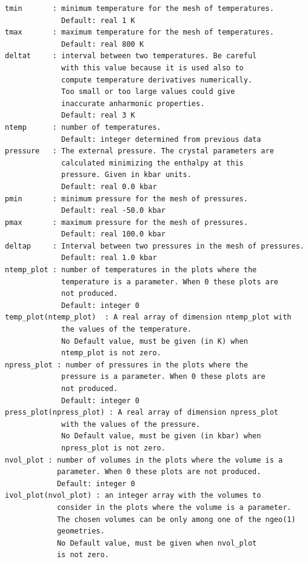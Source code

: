\documentclass[12pt,a4paper,twoside]{report}
\begin{document}
\begin{verbatim}
tmin       : minimum temperature for the mesh of temperatures.
             Default: real 1 K
tmax       : maximum temperature for the mesh of temperatures.
             Default: real 800 K
deltat     : interval between two temperatures. Be careful 
             with this value because it is used also to 
             compute temperature derivatives numerically. 
             Too small or too large values could give 
             inaccurate anharmonic properties.
             Default: real 3 K
ntemp      : number of temperatures.
             Default: integer determined from previous data
pressure   : The external pressure. The crystal parameters are
             calculated minimizing the enthalpy at this 
             pressure. Given in kbar units. 
             Default: real 0.0 kbar
pmin       : minimum pressure for the mesh of pressures.
             Default: real -50.0 kbar
pmax       : maximum pressure for the mesh of pressures.
             Default: real 100.0 kbar
deltap     : Interval between two pressures in the mesh of pressures.
             Default: real 1.0 kbar
ntemp_plot : number of temperatures in the plots where the 
             temperature is a parameter. When 0 these plots are 
             not produced.
             Default: integer 0
temp_plot(ntemp_plot)  : A real array of dimension ntemp_plot with 
             the values of the temperature.
             No Default value, must be given (in K) when 
             ntemp_plot is not zero. 
npress_plot : number of pressures in the plots where the 
             pressure is a parameter. When 0 these plots are 
             not produced.
             Default: integer 0
press_plot(npress_plot) : A real array of dimension npress_plot 
             with the values of the pressure.
             No Default value, must be given (in kbar) when 
             npress_plot is not zero.
nvol_plot : number of volumes in the plots where the volume is a 
            parameter. When 0 these plots are not produced.
            Default: integer 0
ivol_plot(nvol_plot) : an integer array with the volumes to 
            consider in the plots where the volume is a parameter. 
            The chosen volumes can be only among one of the ngeo(1) 
            geometries.
            No Default value, must be given when nvol_plot 
            is not zero.
\end{verbatim}
\end{document}

